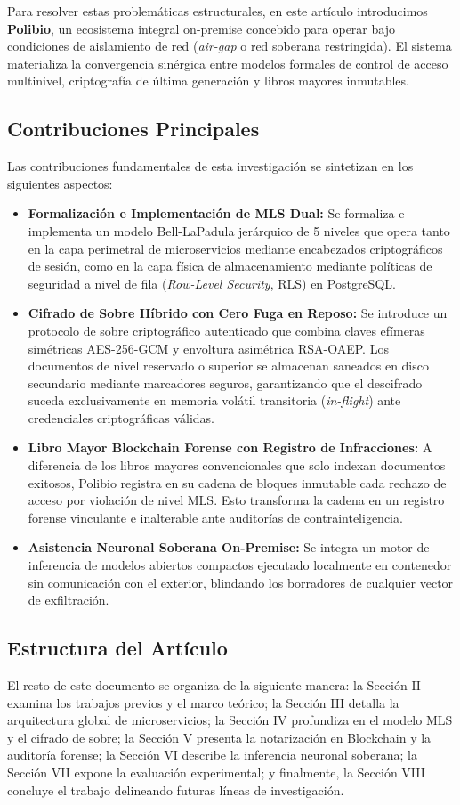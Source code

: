 \documentclass[journal,10pt]{IEEEtran}
\begin{document}
Para resolver estas problemáticas estructurales, en este artículo introducimos \textbf{Polibio}, un ecosistema integral on-premise concebido para operar bajo condiciones de aislamiento de red (\textit{air-gap} o red soberana restringida). El sistema materializa la convergencia sinérgica entre modelos formales de control de acceso multinivel, criptografía de última generación y libros mayores inmutables.

\subsection{Contribuciones Principales}
Las contribuciones fundamentales de esta investigación se sintetizan en los siguientes aspectos:
\begin{itemize}
    \item \textbf{Formalización e Implementación de MLS Dual:} Se formaliza e implementa un modelo Bell-LaPadula jerárquico de 5 niveles que opera tanto en la capa perimetral de microservicios mediante encabezados criptográficos de sesión, como en la capa física de almacenamiento mediante políticas de seguridad a nivel de fila (\textit{Row-Level Security}, RLS) en PostgreSQL.
    \item \textbf{Cifrado de Sobre Híbrido con Cero Fuga en Reposo:} Se introduce un protocolo de sobre criptográfico autenticado que combina claves efímeras simétricas AES-256-GCM y envoltura asimétrica RSA-OAEP. Los documentos de nivel reservado o superior se almacenan saneados en disco secundario mediante marcadores seguros, garantizando que el descifrado suceda exclusivamente en memoria volátil transitoria (\textit{in-flight}) ante credenciales criptográficas válidas.
    \item \textbf{Libro Mayor Blockchain Forense con Registro de Infracciones:} A diferencia de los libros mayores convencionales que solo indexan documentos exitosos, Polibio registra en su cadena de bloques inmutable cada rechazo de acceso por violación de nivel MLS. Esto transforma la cadena en un registro forense vinculante e inalterable ante auditorías de contrainteligencia.
    \item \textbf{Asistencia Neuronal Soberana On-Premise:} Se integra un motor de inferencia de modelos abiertos compactos ejecutado localmente en contenedor sin comunicación con el exterior, blindando los borradores de cualquier vector de exfiltración.
\end{itemize}

\subsection{Estructura del Artículo}
El resto de este documento se organiza de la siguiente manera: la Sección II examina los trabajos previos y el marco teórico; la Sección III detalla la arquitectura global de microservicios; la Sección IV profundiza en el modelo MLS y el cifrado de sobre; la Sección V presenta la notarización en Blockchain y la auditoría forense; la Sección VI describe la inferencia neuronal soberana; la Sección VII expone la evaluación experimental; y finalmente, la Sección VIII concluye el trabajo delineando futuras líneas de investigación.
\end{document}
